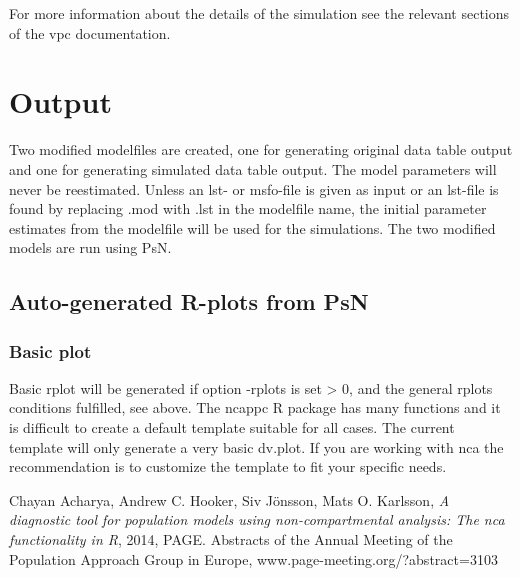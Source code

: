 For more information about the details of the simulation see the relevant sections of the vpc documentation.

\section{Output}
Two modified modelfiles are created, one for generating original data table output and one for generating simulated data table output. The model parameters will never be reestimated. Unless an lst- or msfo-file is given as input or an lst-file is found by replacing .mod with .lst in the modelfile name, the initial parameter estimates from the modelfile will be used for the simulations. The two modified models are run using PsN.

\subsection{Auto-generated R-plots from PsN}
\newcommand{\rplotsconditions}{The default nca template 
requires that R libraries
ggplot2, gridExtra and ncappc are installed.
If the conditions are not fulfilled then no pdf will be generated,
see the .Rout file in the main run directory for error messages.
Please note that the default template only creates a very basic plot, while
there is a large set of functions available in the ncappc package,
so it is recommended to create a custom template for your project.}


\subsubsection*{Basic plot}
Basic rplot will be generated if option -rplots is set > 0,
and the general rplots conditions fulfilled, see above.
The ncappc R package has many functions and it is difficult
to create a default template suitable for all cases. 
The current template will only generate a very basic dv.plot. If you are
working with nca the recommendation is to customize the
template to fit your specific needs.


\begin{thebibliography}{99}
	 Chayan Acharya, Andrew C. Hooker, Siv Jönsson, Mats O. Karlsson, {\em A diagnostic tool for population models using non-compartmental analysis: The nca functionality in R}, 2014, PAGE. Abstracts of the Annual Meeting of the Population Approach Group in Europe, www.page-meeting.org/?abstract=3103 
\end{thebibliography}


